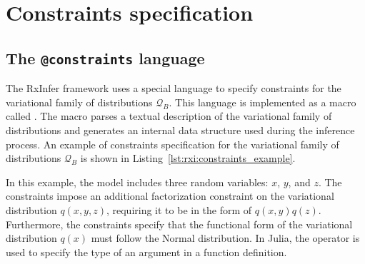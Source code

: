 \section{Constraints specification}\label{chapter-04:section:constraints-specification}

\subsection{The \texttt{@constraints} language}

The RxInfer framework uses a special language to specify constraints for the variational
family of distributions $\mathcal{Q}_B$.
This language is implemented as a macro called .
The  macro parses a textual description of the variational family of
distributions and generates an internal data structure used during the inference process.
An example of constraints specification for the variational family of distributions
$\mathcal{Q}_B$ is shown in Listing~\ref{lst:rxi:constraints_example}.
\begin{figure*}[h!]
  \begin{adjustbox}{minipage=\textwidth,margin=0pt \smallskipamount,center}
  \end{adjustbox}
\end{figure*}

In this example, the model includes three random variables: $x$, $y$, and $z$.
The constraints impose an additional factorization constraint on the variational distribution
$q(x, y, z)$, requiring it to be in the form of $q(x, y)q(z)$.
Furthermore, the constraints specify that the functional form of the variational distribution
$q(x)$ must follow the Normal distribution.
In Julia, the \jlinl{::} operator is used to specify the type of an argument in a function
definition.

